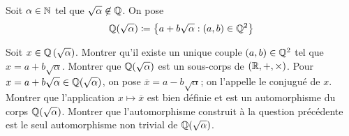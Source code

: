 \documentclass{magnolia}
\begin{document}
Soit $\alpha\in\mathbb{N}$ tel que $\sqrt{\alpha}\not\in\mathbb{Q}$. On pose 
\[\mathbb{Q}(\sqrt{\alpha})\coloneqq\left\{a+b\sqrt{\alpha} : (a,b)\in\mathbb{Q}^2\right\}\]
\begin{questions}
\question Soit $x\in\mathbb{Q}\left(\sqrt{\alpha}\right)$. Montrer qu'il existe un unique
  couple $\left(a,b\right)\in\mathbb{Q}^2$ tel que $x=a+b\sqrt{\alpha}$.
\question Montrer que $\mathbb{Q}(\sqrt{\alpha})$ est un sous-corps de $(\mathbb{R},+,\times)$.
\question Pour $x=a+b\sqrt{\alpha}\in\mathbb{Q}(\sqrt{\alpha})$, on pose
  $\overline{x}=a-b\sqrt{\alpha}$; on l'appelle le conjugué de $x$. Montrer que
  l'application  $x\mapsto \overline{x}$ est bien définie et est un
  automorphisme du corps $\mathbb{Q}(\sqrt{\alpha})$.
\question Montrer que l'automorphisme construit à la question précédente est
  le seul automorphisme non trivial de $\mathbb{Q}(\sqrt{\alpha})$.
\end{questions}


\end{document}
